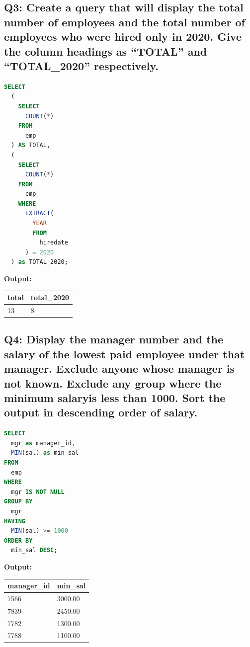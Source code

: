 \documentclass[11pt, a4paper]{article}
\begin{document}
\subsection*{Q3: Create a query that will display the total number of employees and the total number of employees who were hired only in 2020. Give the column headings as “TOTAL” and “TOTAL\_2020” respectively.}
\begin{lstlisting}[language=SQL]
SELECT
  (
    SELECT
      COUNT(*)
    FROM
      emp
  ) AS TOTAL,
  (
    SELECT
      COUNT(*)
    FROM
      emp
    WHERE
      EXTRACT(
        YEAR
        FROM
          hiredate
      ) = 2020
  ) as TOTAL_2020;

\end{lstlisting}
\vspace{0.3cm}
\textbf{Output:}\vspace{0.2cm}
\begin{center}
\begin{tabular}{|l|l|}
\hline
\textbf{total} & \textbf{total\_2020} \\ \hline
13 & 8 \\ \hline
\end{tabular}
\end{center}
\newpage
\subsection*{Q4: Display the manager number and the salary of the lowest paid employee under that manager. Exclude anyone whose manager is not known. Exclude any group where the minimum salaryis less than 1000. Sort the output in descending order of salary.}
\begin{lstlisting}[language=SQL]
SELECT
  mgr as manager_id,
  MIN(sal) as min_sal
FROM
  emp
WHERE
  mgr IS NOT NULL
GROUP BY
  mgr
HAVING
  MIN(sal) >= 1000
ORDER BY
  min_sal DESC;
\end{lstlisting}
\vspace{0.3cm}
\textbf{Output:}\vspace{0.2cm}
\begin{center}
\begin{tabular}{|l|l|}
\hline
\textbf{manager\_id} & \textbf{min\_sal} \\ \hline
7566 & 3000.00 \\ \hline
7839 & 2450.00 \\ \hline
7782 & 1300.00 \\ \hline
7788 & 1100.00 \\ \hline
\end{tabular}
\end{center}
\newpage
\end{document}
